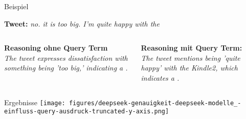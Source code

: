 \documentclass[aspectratio=169]{beamer} %
\begin{document}
\begin{frame}{Beispiel}
\begin{center}
    \textbf{Tweet:} \glqq \textit{no. it is too big. I'm quite happy with the \grqq}
    \vspace{0.45cm}
    \begin{columns}
        \begin{column}{0.45\textwidth}
            \textbf{Reasoning ohne Query Term} \\
            \vspace{0.4cm}
            \glqq \textit{The tweet expresses dissatisfaction with something being 'too big,' indicating a .\grqq}
        \end{column}
        \begin{column}{0.45\textwidth}
            \textbf{Reasoning mit Query Term:} \\
            \vspace{0.4cm}
            \glqq \textit{The tweet mentions being 'quite happy' with the Kindle2, which indicates a .\grqq}
        \end{column}
    \end{columns}
\end{center}
    
\end{frame}



\begin{frame}{Ergebnisse}
    \centering
    \texttt{[image: figures/deepseek-genauigkeit-deepseek-modelle\_-einfluss-query-ausdruck-truncated-y-axis.png]}
\end{frame}

\end{document}

